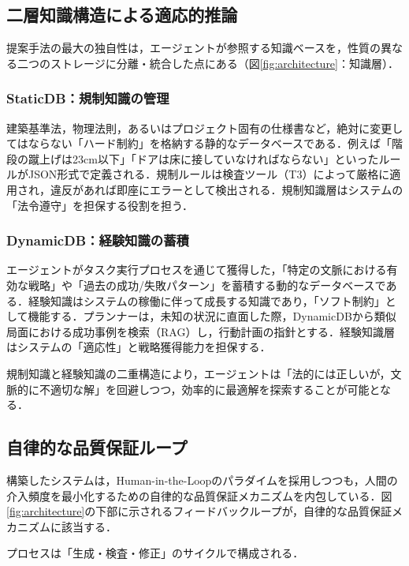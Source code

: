 \documentclass[dvipdfmx, a4paper, 9pt]{deimj}
\begin{document}
\subsection{二層知識構造による適応的推論}

提案手法の最大の独自性は，エージェントが参照する知識ベースを，性質の異なる二つのストレージに分離・統合した点にある（図\ref{fig:architecture}：知識層）．

\subsubsection{StaticDB：規制知識の管理}

建築基準法，物理法則，あるいはプロジェクト固有の仕様書など，絶対に変更してはならない「ハード制約」を格納する静的なデータベースである．例えば「階段の蹴上げは23cm以下」「ドアは床に接していなければならない」といったルールがJSON形式で定義される．規制ルールは検査ツール（T3）によって厳格に適用され，違反があれば即座にエラーとして検出される．規制知識層はシステムの「法令遵守」を担保する役割を担う．

\subsubsection{DynamicDB：経験知識の蓄積}

エージェントがタスク実行プロセスを通じて獲得した，「特定の文脈における有効な戦略」や「過去の成功/失敗パターン」を蓄積する動的なデータベースである\cite{wang2023voyager}．経験知識はシステムの稼働に伴って成長する知識であり，「ソフト制約」として機能する．プランナーは，未知の状況に直面した際，DynamicDBから類似局面における成功事例を検索（RAG\cite{lewis2020rag}）し，行動計画の指針とする．経験知識層はシステムの「適応性」と戦略獲得能力を担保する．

規制知識と経験知識の二重構造により，エージェントは「法的には正しいが，文脈的に不適切な解」を回避しつつ，効率的に最適解を探索することが可能となる．

\subsection{自律的な品質保証ループ}

構築したシステムは，Human-in-the-Loopのパラダイムを採用しつつも，人間の介入頻度を最小化するための自律的な品質保証メカニズムを内包している．図\ref{fig:architecture}の下部に示されるフィードバックループが，自律的な品質保証メカニズムに該当する．

プロセスは「生成・検査・修正」のサイクルで構成される．
\end{document}
